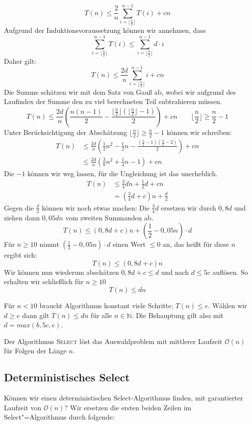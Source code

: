\[T(n) \le \frac{2}{n} \sum_{i= \lfloor \frac{n}{2} \rfloor}^{n-1} T(i) + cn\]
Aufgrund der Induktionsvoraussetzung können wir annehmen, dass 
\[\sum_{i= \lfloor \frac{n}{2} \rfloor}^{n-1} T(i) \le \sum_{i= \lfloor \frac{n}{2} \rfloor}^{n-1} d \cdot i\]
Daher gilt:
\[T(n) \le \frac{2d}{n} \sum_{i=\lfloor\frac{n}{2}\rfloor}^{n-1} i + cn\]
Die Summe schätzen wir mit dem Satz von Gauß ab, wobei wir aufgrund des Laufindex der Summe den zu viel berechneten Teil subtrahieren müssen.
\[ T(n) \le \frac{2d}{n} \left( \frac{n(n-1)}{2} - \frac{\lfloor \frac{n}{2} \rfloor(\lfloor \frac{n}{2} \rfloor -1)}{2} \right) + cn \qquad \lfloor \frac{n}{2} \rfloor \ge \frac{n}{2}-1 \]
Unter Berücksichtigung der Abschätzung $\lfloor \frac{n}{2} \rfloor \ge \frac{n}{2} -1$ können wir schreiben:
\begin{align*}
T(n) & \le \frac{2d}{n} \left( \frac{1}{2}n^2 - \frac{1}{2} n - \frac{(\frac{n}{2} -1) (\frac{n}{2}-2)}{2}\right) + cn\\
     & \le \frac{2d}{n} \left( \frac{3}{8} n^2 + \frac{1}{4}n -1 \right) + cn
\end{align*}
Die $-1$ können wir weg lassen, für die Ungleichung ist das unerheblich.
\begin{align*}
T(n) & \le \frac{3}{4}dn + \frac{1}{2}d + cn \\
     &  = \left( \frac{3}{4} d + c \right) n + \frac{d}{2}
\end{align*}
Gegen die $\frac{d}{2}$ können wir noch etwas machen: Die $\frac{3}{4}d$ ersetzen wir durch $0{,}8d$ und ziehen dann $0{,}05dn$ vom zweiten Summanden ab.
\[ T(n) \le (0{,}8 d + c) n + \left(\frac{1}{2} - 0{,}05 n\right) \cdot d \]
Für $n \ge 10$ nimmt $\left(\frac{1}{2} - 0{,}05 n\right) \cdot d$ einen Wert $\le 0$ an, das heißt für diese $n$ ergibt sich:
\[T(n) \le (0{,}8 d + c) n\]
Wir können nun wiederum abschätzen $0{,}8 d + c \le d$ und nach $d \le 5c$ auflösen. So erhalten wir schließlich für $n \ge 10$
\[T(n) \le dn\]

Für $n < 10$ braucht Algorithmus konstant viele Schritte: $T(n) \le e$. Wählen wir $d \ge e$ dann gilt $T(n) \le dn$ für alle $n \in \mathbb{N}$. Die Behauptung gilt also mit $d=max (b, 5c, e)$.

\begin{Satz}
\hspace{\parindent}Der Algorithmus \textsc{Select} löst das Auswahlproblem mit mittlerer Laufzeit $\mathcal{O}(n)$ für Folgen der Länge $n$.
\end{Satz}

\subsection{Deterministisches Select}
Können wir einen deterministischen Select-Algorithmus finden, mit garantierter Laufzeit von $\mathcal{O}(n)$? Wir ersetzen die ersten beiden Zeilen im Select"=Algorithmus durch folgende:

